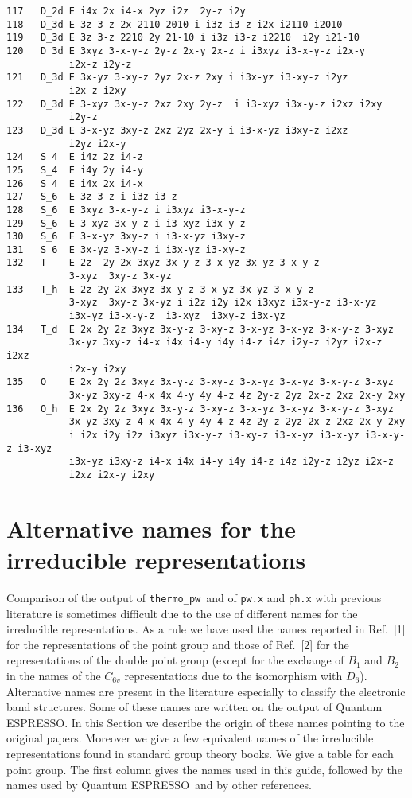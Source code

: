 \documentclass[12pt,a4paper]{article}
\def\qe{{\sc Quantum ESPRESSO}}
\def\thermo{\texttt{thermo\_pw}}
\begin{document}
\begin{verbatim}
117   D_2d E i4x 2x i4-x 2yz i2z  2y-z i2y  
118   D_3d E 3z 3-z 2x 2110 2010 i i3z i3-z i2x i2110 i2010
119   D_3d E 3z 3-z 2210 2y 21-10 i i3z i3-z i2210  i2y i21-10  
120   D_3d E 3xyz 3-x-y-z 2y-z 2x-y 2x-z i i3xyz i3-x-y-z i2x-y 
           i2x-z i2y-z  
121   D_3d E 3x-yz 3-xy-z 2yz 2x-z 2xy i i3x-yz i3-xy-z i2yz 
           i2x-z i2xy  
122   D_3d E 3-xyz 3x-y-z 2xz 2xy 2y-z  i i3-xyz i3x-y-z i2xz i2xy 
           i2y-z  
123   D_3d E 3-x-yz 3xy-z 2xz 2yz 2x-y i i3-x-yz i3xy-z i2xz 
           i2yz i2x-y 
124   S_4  E i4z 2z i4-z 
125   S_4  E i4y 2y i4-y 
126   S_4  E i4x 2x i4-x 
127   S_6  E 3z 3-z i i3z i3-z 
128   S_6  E 3xyz 3-x-y-z i i3xyz i3-x-y-z  
129   S_6  E 3-xyz 3x-y-z i i3-xyz i3x-y-z  
130   S_6  E 3-x-yz 3xy-z i i3-x-yz i3xy-z  
131   S_6  E 3x-yz 3-xy-z i i3x-yz i3-xy-z  
132   T    E 2z  2y 2x 3xyz 3x-y-z 3-x-yz 3x-yz 3-x-y-z 
           3-xyz  3xy-z 3x-yz 
133   T_h  E 2z 2y 2x 3xyz 3x-y-z 3-x-yz 3x-yz 3-x-y-z 
           3-xyz  3xy-z 3x-yz i i2z i2y i2x i3xyz i3x-y-z i3-x-yz 
           i3x-yz i3-x-y-z  i3-xyz  i3xy-z i3x-yz 
134   T_d  E 2x 2y 2z 3xyz 3x-y-z 3-xy-z 3-x-yz 3-x-yz 3-x-y-z 3-xyz
           3x-yz 3xy-z i4-x i4x i4-y i4y i4-z i4z i2y-z i2yz i2x-z i2xz 
           i2x-y i2xy
135   O    E 2x 2y 2z 3xyz 3x-y-z 3-xy-z 3-x-yz 3-x-yz 3-x-y-z 3-xyz
           3x-yz 3xy-z 4-x 4x 4-y 4y 4-z 4z 2y-z 2yz 2x-z 2xz 2x-y 2xy
136   O_h  E 2x 2y 2z 3xyz 3x-y-z 3-xy-z 3-x-yz 3-x-yz 3-x-y-z 3-xyz
           3x-yz 3xy-z 4-x 4x 4-y 4y 4-z 4z 2y-z 2yz 2x-z 2xz 2x-y 2xy
           i i2x i2y i2z i3xyz i3x-y-z i3-xy-z i3-x-yz i3-x-yz i3-x-y-z i3-xyz
           i3x-yz i3xy-z i4-x i4x i4-y i4y i4-z i4z i2y-z i2yz i2x-z 
           i2xz i2x-y i2xy
\end{verbatim}
\newpage
\section{\color{coral}Alternative names for the irreducible representations}
Comparison of the output of \thermo\ and of \texttt{pw.x} and \texttt{ph.x} 
with previous literature is sometimes difficult due to the use of different 
names for the irreducible representations. As a rule we have used the names
reported in Ref.~[1] for the representations of the point group and those
of Ref.~[2] for the representations of the double point group
(except for the exchange of $B_1$ and $B_2$ in the names of the $C_{6v}$ 
representations due to the isomorphism with $D_6$). Alternative
names are present in the literature especially to classify the electronic
band structures. Some of these names are written on the output
of \qe. In this Section we describe the origin of these names pointing to
the original papers. Moreover we give a few equivalent names of the irreducible representations found in standard 
group theory books. 
We give a table for each point group. The first column gives the names 
used in this guide, followed by the names used by \qe\ and by 
other references.
\end{document}
